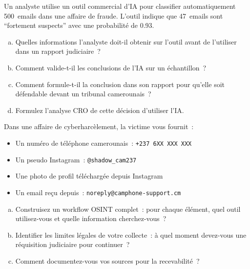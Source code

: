 \begin{boxexo}[title={\ding{45}\quad Exercice~5.1. Évaluation d'un outil IA \niveaubase}]
Un analyste utilise un outil commercial d'IA pour classifier automatiquement
500~emails dans une affaire de fraude. L'outil indique que 47~emails sont
``fortement suspects'' avec une probabilité de 0.93.

\begin{enumerate}[(a)]
    \item Quelles informations l'analyste doit-il obtenir sur l'outil
          avant de l'utiliser dans un rapport judiciaire~?
    \item Comment valide-t-il les conclusions de l'IA sur un échantillon~?
    \item Comment formule-t-il la conclusion dans son rapport pour
          qu'elle soit défendable devant un tribunal camerounais~?
    \item Formulez l'analyse CRO de cette décision d'utiliser l'IA.
\end{enumerate}
\end{boxexo}

\begin{boxexo}[title={\ding{45}\quad Exercice~5.2. Workflow OSINT \niveaumoyen}]
Dans une affaire de cyberharcèlement, la victime vous fournit~:
\begin{itemize}
    \item Un numéro de téléphone camerounais~: \texttt{+237 6XX XXX XXX}
    \item Un pseudo Instagram~: \texttt{@shadow\_cam237}
    \item Une photo de profil téléchargée depuis Instagram
    \item Un email reçu depuis~: \texttt{noreply@camphone-support.cm}
\end{itemize}

\begin{enumerate}[(a)]
    \item Construisez un workflow OSINT complet~: pour chaque élément,
          quel outil utilisez-vous et quelle information cherchez-vous~?
    \item Identifier les limites légales de votre collecte~: à quel
          moment devez-vous une réquisition judiciaire pour continuer~?
    \item Comment documentez-vous vos sources pour la recevabilité~?
\end{enumerate}
\end{boxexo}

